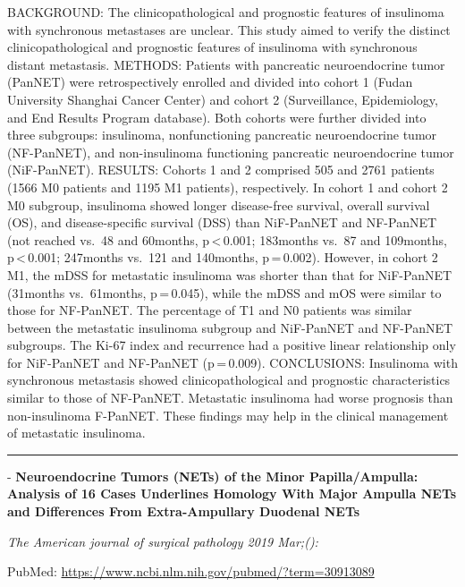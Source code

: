 \documentclass[]{article}
\begin{document}
BACKGROUND: The clinicopathological and prognostic features of
insulinoma with synchronous metastases are unclear. This study aimed to
verify the distinct clinicopathological and prognostic features of
insulinoma with synchronous distant metastasis. METHODS: Patients with
pancreatic neuroendocrine tumor (PanNET) were retrospectively enrolled
and divided into cohort 1 (Fudan University Shanghai Cancer Center) and
cohort 2 (Surveillance, Epidemiology, and End Results Program database).
Both cohorts were further divided into three subgroups: insulinoma,
nonfunctioning pancreatic neuroendocrine tumor (NF-PanNET), and
non-insulinoma functioning pancreatic neuroendocrine tumor (NiF-PanNET).
RESULTS: Cohorts 1 and 2 comprised 505 and 2761 patients (1566 M0
patients and 1195 M1 patients), respectively. In cohort 1 and cohort 2
M0 subgroup, insulinoma showed longer disease-free survival, overall
survival (OS), and disease-specific survival (DSS) than NiF-PanNET and
NF-PanNET (not reached vs.~48 and 60months, p\,\textless{}\,0.001;
183months vs.~87 and 109months, p\,\textless{}\,0.001; 247months vs.~121
and 140months, p\,=\,0.002). However, in cohort 2 M1, the mDSS for
metastatic insulinoma was shorter than that for NiF-PanNET (31months
vs.~61months, p\,=\,0.045), while the mDSS and mOS were similar to those
for NF-PanNET. The percentage of T1 and N0 patients was similar between
the metastatic insulinoma subgroup and NiF-PanNET and NF-PanNET
subgroups. The Ki-67 index and recurrence had a positive linear
relationship only for NiF-PanNET and NF-PanNET (p\,=\,0.009).
CONCLUSIONS: Insulinoma with synchronous metastasis showed
clinicopathological and prognostic characteristics similar to those of
NF-PanNET. Metastatic insulinoma had worse prognosis than non-insulinoma
F-PanNET. These findings may help in the clinical management of
metastatic insulinoma.

{}

{}

\begin{center}\rule{0.5\linewidth}{\linethickness}\end{center}

 - \textbf{Neuroendocrine Tumors (NETs) of the Minor Papilla/Ampulla:
Analysis of 16 Cases Underlines Homology With Major Ampulla NETs and
Differences From Extra-Ampullary Duodenal NETs}

\emph{The American journal of surgical pathology 2019 Mar;():}

PubMed: \url{https://www.ncbi.nlm.nih.gov/pubmed/?term=30913089}
\end{document}
